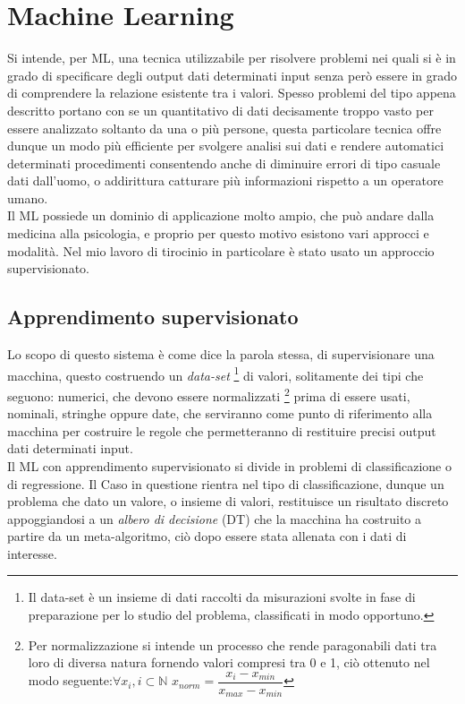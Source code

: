 \chapter{Machine Learning}
\nocite{Nilsson96introductionto}Si intende, per ML, una tecnica utilizzabile per risolvere problemi  nei quali si è in grado di specificare degli output dati determinati input senza però essere in grado di comprendere la relazione esistente tra i valori. Spesso problemi del tipo appena descritto portano con se un quantitativo di dati decisamente troppo vasto per essere analizzato soltanto da una o più persone, questa particolare tecnica offre dunque un modo più efficiente per svolgere analisi sui dati e rendere automatici determinati procedimenti consentendo anche di diminuire errori di tipo casuale dati dall'uomo, o addirittura catturare più informazioni rispetto a un operatore umano.\\
Il ML possiede un dominio di applicazione molto ampio, che può andare dalla medicina alla psicologia, e proprio per questo motivo esistono vari approcci e modalità. Nel mio lavoro di tirocinio in particolare è stato usato un approccio supervisionato.\\

\section{Apprendimento supervisionato}
Lo scopo di questo sistema è come dice la parola stessa, di supervisionare una macchina, questo costruendo un \emph{data-set}  \footnote{Il data-set è un insieme di dati raccolti da misurazioni svolte in fase di preparazione per lo studio del problema, classificati in modo opportuno.}
di valori, solitamente dei tipi che seguono: numerici, che devono essere normalizzati \footnote{Per normalizzazione si intende un processo che rende paragonabili dati tra loro di diversa natura fornendo valori compresi tra 0 e 1, ciò ottenuto nel modo seguente:\newline $\forall x_{i}, i\subset\mathbb{N}$ $x_{norm} = \dfrac{x_{i}-x_{min}}{x_{max} - x_{min}} $} prima di essere usati, nominali, stringhe oppure date, che serviranno come punto di riferimento alla macchina per costruire le regole che permetteranno di restituire precisi output dati determinati input.\\
Il ML con apprendimento supervisionato si divide in problemi di classificazione o di regressione. Il Caso in questione rientra nel tipo di classificazione, dunque un problema che dato un valore, o insieme di valori, restituisce un risultato discreto appoggiandosi a un \emph{albero di decisione} (DT) che la macchina ha costruito a partire da un meta-algoritmo, ciò dopo essere stata allenata con i dati di interesse.\\


